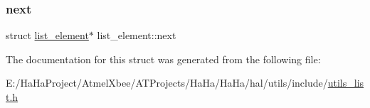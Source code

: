 \subsubsection{\texorpdfstring{next}{next}}
{\footnotesize\ttfamily struct \hyperlink{structlist__element}{list\+\_\+element}$\ast$ list\+\_\+element\+::next}



The documentation for this struct was generated from the following file\+:\begin{DoxyCompactItemize}
\item 
E\+:/\+Ha\+Ha\+Project/\+Atmel\+Xbee/\+A\+T\+Projects/\+Ha\+Ha/\+Ha\+Ha/hal/utils/include/\hyperlink{utils__list_8h}{utils\+\_\+list.\+h}\end{DoxyCompactItemize}
